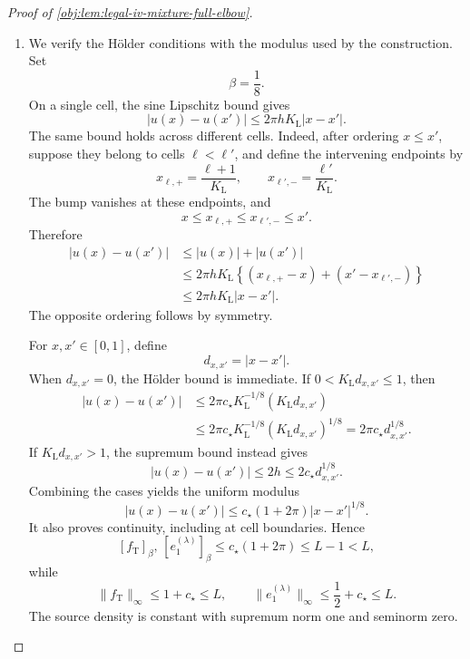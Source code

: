 \documentclass[11pt]{article}
\begin{document}
\begin{proof}[Proof of \cref{obj:lem:legal-iv-mixture-full-elbow}]
\begin{enumerate}
\item
We verify the Hölder conditions with the modulus used by the construction. Set
\[
\beta=\frac18.
\]
On a single cell, the sine Lipschitz bound gives
\[
|u(x)-u(x')|
\le 2\pi hK_{\mathrm L}|x-x'|.
\]
The same bound holds across different cells. Indeed, after ordering \(x\le x'\), suppose they belong to cells \(\ell<\ell'\), and define the intervening endpoints by
\[
x_{\ell,+}=\frac{\ell+1}{K_{\mathrm L}},
\qquad
x_{\ell',-}=\frac{\ell'}{K_{\mathrm L}}.
\]
The bump vanishes at these endpoints, and
\[
x\le x_{\ell,+}\le x_{\ell',-}\le x'.
\]
Therefore
\[
\begin{aligned}
|u(x)-u(x')|
&\le |u(x)|+|u(x')|\\
&\le 2\pi hK_{\mathrm L}
\left\{(x_{\ell,+}-x)+(x'-x_{\ell',-})\right\}\\
&\le 2\pi hK_{\mathrm L}|x-x'|.
\end{aligned}
\]
The opposite ordering follows by symmetry.

For \(x,x'\in[0,1]\), define
\[
d_{x,x'}=|x-x'|.
\]
When \(d_{x,x'}=0\), the Hölder bound is immediate. If
\(0<K_{\mathrm L}d_{x,x'}\le1\), then
\[
\begin{aligned}
|u(x)-u(x')|
&\le2\pi c_{\star}K_{\mathrm L}^{-1/8}
(K_{\mathrm L}d_{x,x'})\\
&\le2\pi c_{\star}K_{\mathrm L}^{-1/8}
(K_{\mathrm L}d_{x,x'})^{1/8}
=2\pi c_{\star}d_{x,x'}^{1/8}.
\end{aligned}
\]
If \(K_{\mathrm L}d_{x,x'}>1\), the supremum bound instead gives
\[
|u(x)-u(x')|
\le2h
\le2c_{\star}d_{x,x'}^{1/8}.
\]
Combining the cases yields the uniform modulus
\[
|u(x)-u(x')|
\le c_{\star}(1+2\pi)|x-x'|^{1/8}.
\]
It also proves continuity, including at cell boundaries. Hence
\[
[f_{\mathrm T}]_{\beta},\,[e_1^{(\lambda)}]_{\beta}
\le c_{\star}(1+2\pi)\le L-1<L,
\]
while
\[
\|f_{\mathrm T}\|_{\infty}\le1+c_{\star}\le L,
\qquad
\|e_1^{(\lambda)}\|_{\infty}\le\frac12+c_{\star}\le L.
\]
The source density is constant with supremum norm one and seminorm zero.


\end{enumerate}
\end{proof}
\end{document}
